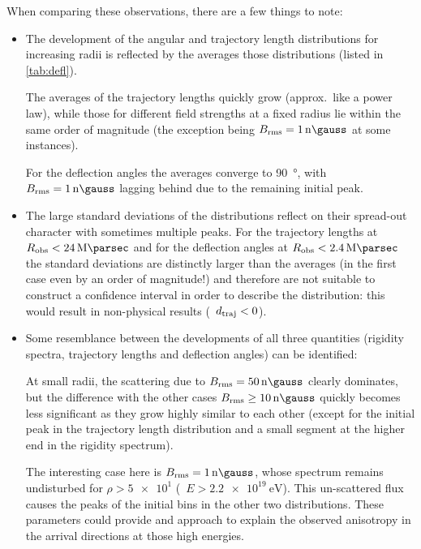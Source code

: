 When comparing these observations, there are a few things to note:
\begin{itemize}
    \item The development of the angular and trajectory length distributions
        for increasing radii is reflected by the averages those distributions
        (listed in \cref{tab:defl}).

        The averages of the trajectory lengths quickly grow (approx.~like a
        power law), while those for different field strengths at a fixed radius
        lie within the same order of magnitude (the exception being
        $\Brms=\SI{1}{\nano\gauss}$ at some instances).

        For the deflection angles the averages converge to \SI{90}{\degree},
        with $\Brms=\SI{1}{\nano\gauss}$ lagging behind due to the remaining
        initial peak.

    \item The large standard deviations of the distributions reflect on their
        spread-out character with sometimes multiple peaks. For the trajectory
        lengths at $\Robserver<\SI{24}{\mega\parsec}$ and for the deflection
        angles at $\Robserver<\SI{2.4}{\mega\parsec}$ the standard deviations
        are distinctly larger than the averages (in the first case even by an
        order of magnitude!) and therefore are not suitable to construct a
        confidence interval in order to describe the distribution: this would
        result in non-physical results (\ie~$d_{\mathrm{traj}}<0$).

    \item Some resemblance between the developments of all three quantities
        (rigidity spectra, trajectory lengths and deflection angles) can be
        identified:

        At small radii, the scattering due to $\Brms=\SI{50}{\nano\gauss}$
        clearly dominates, but the difference with the other cases
        $\Brms\ge\SI{10}{\nano\gauss}$ quickly becomes less significant as they
        grow highly similar to each other (except for the initial peak in the
        trajectory length distribution and a small segment at the higher end in
        the rigidity spectrum).

        The interesting case here is $\Brms=\SI{1}{\nano\gauss}$, whose
        spectrum remains undisturbed for $\rho>\num{5e1}$
        (\ie~$E>\SI{2.2e19}{\eV}$). This un-scattered flux causes the peaks of
        the initial bins in the other two distributions. These parameters
        could provide and approach to explain the observed anisotropy in the
        arrival directions at those high energies.

\end{itemize}

